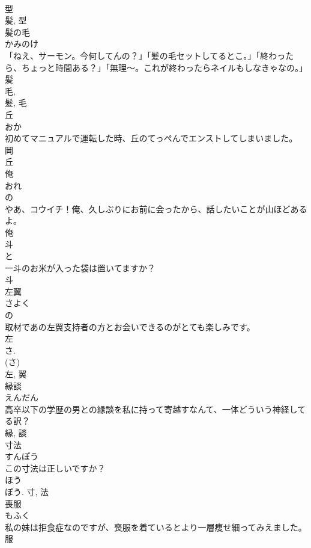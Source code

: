 \documentclass[8pt]{extreport}
\begin{document}
\begin{CJK}{UTF8}{min}
\\	型 
\\	髪, 型	
\\	髪の毛	
\\	かみのけ	
\\	「ねえ、サーモン。今何してんの？」「髪の毛セットしてるとこ。」「終わったら、ちょっと時間ある？」「無理〜。これが終わったらネイルもしなきゃなの。」	
\\	髪 
\\	毛, 
\\	髪, 毛	
\\	丘	
\\	おか	
\\	初めてマニュアルで運転した時、丘のてっぺんでエンストしてしまいました。	
\\	岡 
\\	丘	
\\	俺	
\\	おれ	
\\	の 
\\	やあ、コウイチ！俺、久しぶりにお前に会ったから、話したいことが山ほどあるよ。	
\\	俺	
\\	斗	
\\	と	
\\	一斗のお米が入った袋は置いてますか？	
\\	斗	
\\	左翼	
\\	さよく	
\\	の 
\\	取材であの左翼支持者の方とお会いできるのがとても楽しみです。	
\\	左 
\\	さ. 
\\	(さ) 
\\	左, 翼	
\\	縁談	
\\	えんだん	
\\	高卒以下の学歴の男との縁談を私に持って寄越すなんて、一体どういう神経してる訳？	
\\	縁, 談	
\\	寸法	
\\	すんぽう	
\\	この寸法は正しいですか？	
\\	ほう 
\\	ぽう.	寸, 法	
\\	喪服	
\\	もふく	
\\	私の妹は拒食症なのですが、喪服を着ているとより一層痩せ細ってみえました。	
\\	服 

\end{CJK}
\end{document}
